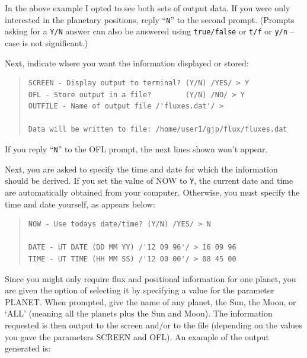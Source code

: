 \documentclass[11pt,twoside]{article}
\newenvironment{myquote}{\begin{quote}\begin{small}}{\end{small}\end{quote}}
\renewcommand{\_}{\texttt{\symbol{95}}}
\begin{document}
In the above example I opted to see both sets of output data. 
If you were only interested in the planetary positions, reply ``{\tt{N}}''
to the second prompt.
(Prompts asking for a {\tt{Y/N}} answer can also be answered using
{\tt{true/false}} or {\tt{t/f}} or {\tt{y/n}} --
case is not significant.)

Next, indicate where you want the information displayed or stored: 

\begin{myquote}
\begin{verbatim}
SCREEN - Display output to terminal? (Y/N) /YES/ > Y
OFL - Store output in a file?        (Y/N) /NO/ > Y
OUTFILE - Name of output file /'fluxes.dat'/ > 
 
Data will be written to file: /home/user1/gjp/flux/fluxes.dat
\end{verbatim} 
\end{myquote}

If you reply ``{\tt{N}}'' to the OFL prompt, the next lines shown won't appear.

Next, you are asked to specify the time and date for which the information
should be derived.
If you set the value of NOW to {\tt{Y}}, the current date
and time are automatically obtained from your computer.
Otherwise, you must specify the time and date yourself, as appears below:

\begin{myquote}
\begin{verbatim}
NOW - Use todays date/time? (Y/N) /YES/ > N
 
DATE - UT DATE (DD MM YY) /'12 09 96'/ > 16 09 96
TIME - UT TIME (HH MM SS) /'12 00 00'/ > 08 45 00
\end{verbatim}
\end{myquote}

Since you might only require flux and positional information for one planet,
you are given the option of selecting it by specifying a value for the 
parameter PLANET.
When prompted, give the name of any planet, the Sun, the Moon,
or `ALL' (meaning all the planets plus the Sun and Moon).
The information requested is then output to the screen and/or to the file
(depending on the values you gave the parameters SCREEN and OFL).
An example of the output generated is:
\end{document}
